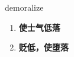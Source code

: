 
\begin{frame}
{\huge demoralize}
\begin{center}
\begin{enumerate}\Large
  \item \textbf{使士气低落}
  \item \textbf{贬低，使堕落}
\end{enumerate}
\end{center}
\end{frame}
